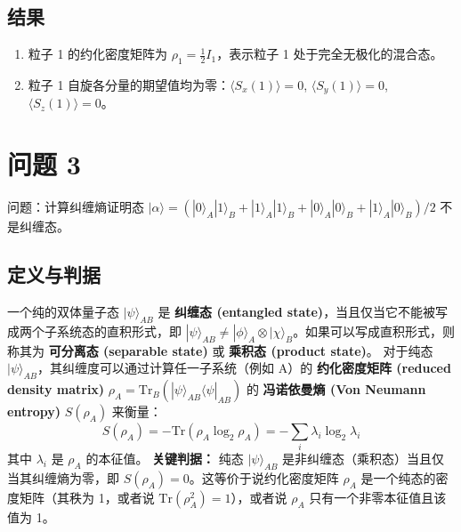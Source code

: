 \documentclass[12pt, a4paper]{article}
\newcommand{\otimesop}{\otimes}
\begin{document}
\subsection*{结果}
\begin{enumerate}
    \item 粒子 1 的约化密度矩阵为 \(\rho_1 = \frac{1}{2} I_1\)，表示粒子 1 处于完全无极化的混合态。
    \item 粒子 1 自旋各分量的期望值均为零：\(\langle S_x(1) \rangle = 0\), \(\langle S_y(1) \rangle = 0\), \(\langle S_z(1) \rangle = 0\)。
\end{enumerate}

\section*{问题 3}
问题：计算纠缠熵证明态 \(|\alpha\rangle = (|0\rangle_A|1\rangle_B + |1\rangle_A|1\rangle_B + |0\rangle_A|0\rangle_B + |1\rangle_A|0\rangle_B)/2\) 不是纠缠态。
\subsection*{定义与判据}
一个纯的双体量子态 \(|\psi\rangle_{AB}\) 是 \textbf{纠缠态 (entangled state)}，当且仅当它不能被写成两个子系统态的直积形式，即 \(|\psi\rangle_{AB} \neq |\phi\rangle_A \otimesop |\chi\rangle_B\)。如果可以写成直积形式，则称其为 \textbf{可分离态 (separable state)} 或 \textbf{乘积态 (product state)}。
对于纯态 \(|\psi\rangle_{AB}\)，其纠缠度可以通过计算任一子系统（例如 A）的 \textbf{约化密度矩阵 (reduced density matrix)} \(\rho_A = \text{Tr}_B(|\psi\rangle_{AB}\langle\psi|_{AB})\) 的 \textbf{冯诺依曼熵 (Von Neumann entropy)} \(S(\rho_A)\) 来衡量：
\[ S(\rho_A) = -\text{Tr}(\rho_A \log_2 \rho_A) = -\sum_i \lambda_i \log_2 \lambda_i \]
其中 \(\lambda_i\) 是 \(\rho_A\) 的本征值。
\textbf{关键判据：} 纯态 \(|\psi\rangle_{AB}\) 是非纠缠态（乘积态）当且仅当其纠缠熵为零，即 \(S(\rho_A) = 0\)。这等价于说约化密度矩阵 \(\rho_A\) 是一个纯态的密度矩阵（其秩为 1，或者说 \(\text{Tr}(\rho_A^2) = 1\)），或者说 \(\rho_A\) 只有一个非零本征值且该值为 1。
\end{document}
